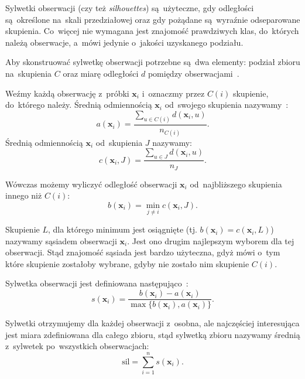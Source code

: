\documentclass{praca1}
\begin{document}
Sylwetki obserwacji (czy też \emph{silhouettes}) są~użyteczne, gdy odległości są~określone na~skali przedziałowej oraz gdy pożądane są~wyraźnie odseparowane skupienia. Co~więcej nie wymagana jest znajomość prawdziwych klas, do~których należą obserwacje, a~mówi jedynie o~jakości uzyskanego podziału.

Aby skonstruować sylwetkę obserwacji potrzebne są~dwa elementy: podział zbioru na~skupienia $C$ oraz miarę odległości $d$ pomiędzy obserwacjami~\cite{Rousseeuw1987:silhoutte}.

\begin{definition}
Weźmy każdą obserwację z~próbki $\mathbf{x}_i$ i~oznaczmy przez $C(i)$ skupienie, do~którego należy. Średnią odmiennością $\mathbf{x}_i$ od~swojego skupienia nazywamy~\cite{Rousseeuw1987:silhoutte}:
\begin{equation*}
a(\mathbf{x}_i) = \frac{\sum_{u \in C(i)} d(\mathbf{x}_i, u)}{n_{C(i)}}.
\end{equation*}
Średnią odmiennością $\mathbf{x}_i$ od~skupienia $J$ nazywamy:
\begin{equation*}
c(\mathbf{x}_i, J) = \frac{\sum_{u \in J} d(\mathbf{x}_i, u)}{n_{J}}.
\end{equation*}
\end{definition}
Wówczas możemy wyliczyć odległość obserwacji $\mathbf{x}_i$ od~najbliższego skupienia innego niż $C(i)$:
\begin{equation*}
b(\mathbf{x}_i) = \min\limits_{j \neq i} c(\mathbf{x}_i, J).
\end{equation*}


Skupienie $L$, dla którego minimum jest osiągnięte (tj. $b(\mathbf{x}_i) = c(\mathbf{x}_i, L)$) nazywamy sąsiadem obserwacji $\mathbf{x}_i$. Jest ono drugim najlepszym wyborem dla tej obserwacji. Stąd znajomość sąsiada jest bardzo użyteczna, gdyż mówi o~tym które skupienie zostałoby wybrane, gdyby nie zostało nim skupienie $C(i)$.

\begin{definition}
Sylwetka obserwacji jest definiowana następująco~\cite{Rousseeuw1987:silhoutte}:
\begin{equation*}
s(\mathbf{x}_i) = \frac{b(\mathbf{x}_i) - a(\mathbf{x}_i)}{\max\{b(\mathbf{x}_i), a(\mathbf{x}_i)\}}.
\end{equation*}
\end{definition}

Sylwetki otrzymujemy dla każdej obserwacji z~osobna, ale najczęściej interesująca jest miara zdefiniowana dla całego zbioru, stąd sylwetką zbioru nazywamy średnią z~sylwetek po~wszystkich obserwacjach:
\begin{equation*}
\mathrm{sil} = \sum\limits_{i=1}^{n}s(\mathbf{x}_i).
\end{equation*}
\end{document}
